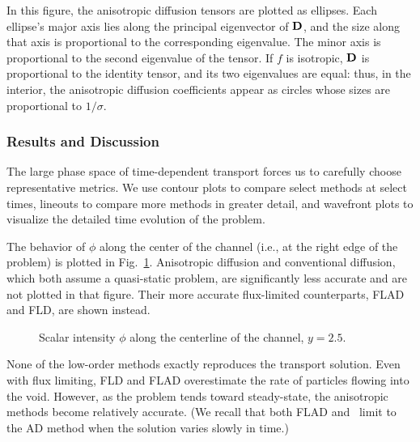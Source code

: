 In this figure, the anisotropic diffusion tensors are plotted as ellipses. Each
ellipse's major axis
lies along the principal eigenvector of $\mathbf{D}$, and the size along that axis is
proportional to the corresponding eigenvalue. The minor axis is proportional to
the second eigenvalue of the tensor. If $f$ is isotropic, $\mathbf{D}$ is
proportional to the identity tensor, and its two eigenvalues are equal: thus, in
the interior, the anisotropic diffusion coefficients appear as circles whose
sizes are proportional to $1/\sigma$.

\subsubsection{Results and Discussion}

The large phase space of time-dependent transport forces us to carefully choose
representative metrics. We use contour plots to compare select methods at
select times, lineouts to compare more methods in greater detail, and wavefront
plots to visualize the detailed time evolution of the problem.

The behavior of $\phi$ along the center of the channel (i.e., at the
right edge of the problem) is plotted in Fig.~\ref{fig:tdReactor}. Anisotropic
diffusion and conventional diffusion, which both assume a quasi-static problem,
are significantly less accurate and are not plotted in that figure. Their
more accurate flux-limited counterparts, FLAD and FLD, are shown instead.

\begin{figure}[htb]
  \centering\small
  \subfloat[$t=2$]{%
    \hspace{-.25in}%
    }%
  \subfloat[$t=5$]{%
    \hspace{-.25in}%
    }

  \subfloat[$t=10$]{%
    \hspace{-.25in}%
    }%
  \subfloat[$t=15$]{%
    \hspace{-.25in}%
    }

  \caption{Scalar intensity $\phi$ along the centerline of the channel, $y=2.5$.}
  \label{fig:tdReactor}
\end{figure}

None of the low-order methods exactly reproduces the transport solution. Even
with flux
limiting, FLD and FLAD overestimate the rate of particles flowing into the void.
However, as the problem tends toward steady-state, the anisotropic
methods become relatively accurate. (We recall that both FLAD and \APone\ limit
to the AD method when the solution varies slowly in time.)

